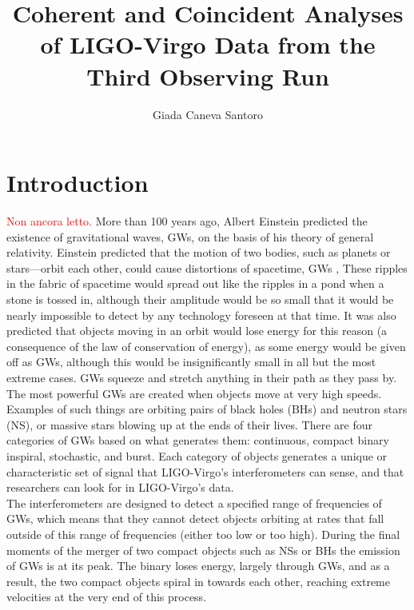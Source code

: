 \documentclass[binding=0.6cm, LaM]{sapthesis}
\title{Coherent and Coincident Analyses of LIGO-Virgo Data from the Third Observing Run}
\author{Giada Caneva Santoro}
\newcommand{\fpg}[1]{\textcolor{red}{#1} }
\begin{document}
\frontmatter
\maketitle
\dedication{Fortsett å gå.}


\tableofcontents

\mainmatter 

\chapter{Introduction}
\fpg{Non ancora letto.}%
	More than 100 years ago, Albert Einstein predicted the existence of gravitational waves,
	GWs, on the basis of his theory of general relativity.  
	Einstein predicted that the motion of two bodies, such as planets or stars—orbit each other,
	could cause distortions of spacetime, GWs \cite{1,2}, 
	These ripples in the fabric of spacetime would spread out like the ripples in a pond when a stone is tossed in,
	although their amplitude would be so small that it would be nearly impossible to detect by any technology foreseen at that time.
	It was also predicted that objects moving in an orbit would lose energy for this reason 
	(a consequence of the law of conservation of energy), as some energy would be given off as GWs, 
	although this would be insignificantly small in all but the most extreme cases. 
	GWs squeeze and stretch anything in their path as they pass by. \\
	The most powerful GWs are created when objects move at very high speeds. 
	Examples of such things are orbiting pairs of black holes (BHs) and neutron stars (NS), 
	or massive stars blowing up at the ends of their lives.
	There are four categories of GWs based on what generates them: 
	continuous, compact binary inspiral, stochastic, and burst. 	
	Each category of objects generates a unique or characteristic set of signal 
	that LIGO-Virgo's interferometers can sense, and that researchers can look for in LIGO-Virgo’s data. \\ 
        The interferometers are designed to detect a specified range of frequencies of GWs,
        which means that they cannot detect objects orbiting at rates that fall outside of this range of frequencies 
        (either too low or too high). 
	During the final moments of the merger of two compact objects such as NSs 
	or BHs the emission of GWs is at its peak. The binary loses energy, 
	largely through GWs, and as a result, the two compact objects spiral in towards each other, 
	reaching extreme velocities at the very end of this process. 
\end{document}

